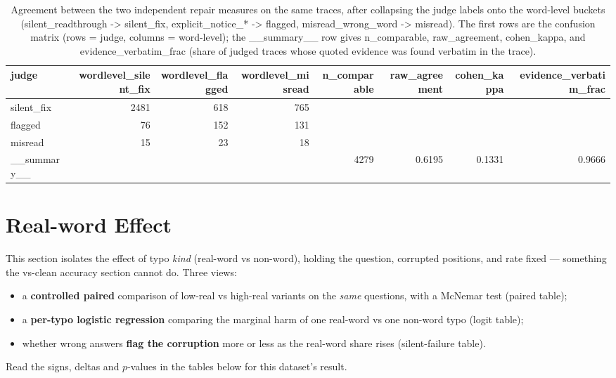 \documentclass[11pt]{article}
\begin{document}
\begin{table}[H]
\centering
\caption{Agreement between the two independent repair measures on the same traces, after collapsing the judge labels onto the word-level buckets (silent\_readthrough -> silent\_fix, explicit\_notice\_* -> flagged, misread\_wrong\_word -> misread). The first rows are the confusion matrix (rows = judge, columns = word-level); the \_\_summary\_\_ row gives n\_comparable, raw\_agreement, cohen\_kappa, and evidence\_verbatim\_frac (share of judged traces whose quoted evidence was found verbatim in the trace).}
\small
\begin{adjustbox}{max width=\textwidth}
\begin{tabular}{lrrrrrrr}
\toprule
\textbf{judge} & \textbf{wordlevel\_silent\_fix} & \textbf{wordlevel\_flagged} & \textbf{wordlevel\_misread} & \textbf{n\_comparable} & \textbf{raw\_agreement} & \textbf{cohen\_kappa} & \textbf{evidence\_verbatim\_frac} \\
\midrule
silent\_fix & 2481 & 618 & 765 &  &  &  &  \\
flagged & 76 & 152 & 131 &  &  &  &  \\
misread & 15 & 23 & 18 &  &  &  &  \\
\_\_summary\_\_ &  &  &  & 4279 & 0.6195 & 0.1331 & 0.9666 \\
\bottomrule
\end{tabular}
\end{adjustbox}
\end{table}

\section*{Real-word Effect}
\noindent This section isolates the effect of typo \emph{kind}
(real-word vs non-word), holding the question, corrupted positions, and rate fixed ---
something the vs-clean accuracy section cannot do. Three views:
\begin{itemize}\setlength{\itemsep}{1pt}
  \item a \textbf{controlled paired} comparison of low-real vs high-real variants on
  the \emph{same} questions, with a McNemar test (paired table);
  \item a \textbf{per-typo logistic regression} comparing the marginal harm of one
  real-word vs one non-word typo (logit table);
  \item whether wrong answers \textbf{flag the corruption} more or less as the
  real-word share rises (silent-failure table).
\end{itemize}
\noindent Read the signs, deltas and $p$-values in the tables below for this
dataset's result.
\medskip
\end{document}

